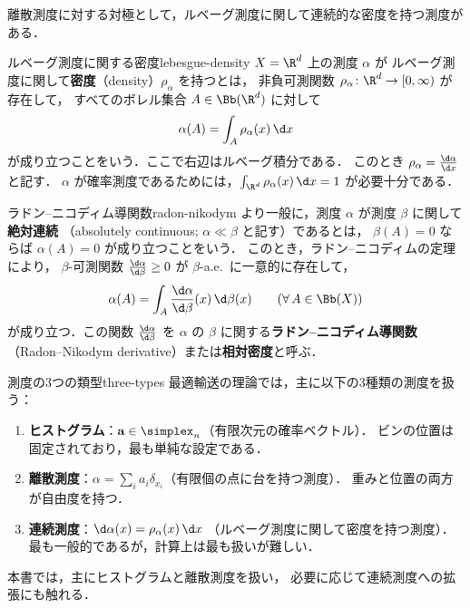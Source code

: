 離散測度に対する対極として，ルベーグ測度に関して連続的な密度を持つ測度がある．

\begin{definition}{ルベーグ測度に関する密度}{lebesgue-density}
  $X = \R^d$ 上の測度 $\alpha$ が
  ルベーグ測度に関して\textbf{密度}（density）$\rho_\alpha$ を持つとは，
  非負可測関数 $\rho_\alpha \colon \R^d \to [0, \infty)$ が存在して，
  すべてのボレル集合 $A \in \Bb(\R^d)$ に対して
  \[
    \alpha(A) = \int_A \rho_\alpha(x) \, \d x
  \]
  が成り立つことをいう．ここで右辺はルベーグ積分である．
  このとき $\rho_\alpha = \frac{\d\alpha}{\d x}$ と記す．
  $\alpha$ が確率測度であるためには，$\int_{\R^d} \rho_\alpha(x) \, \d x = 1$ が必要十分である．
\end{definition}

\begin{definition}{ラドン--ニコディム導関数}{radon-nikodym}
  より一般に，測度 $\alpha$ が測度 $\beta$ に関して\textbf{絶対連続}
  （absolutely continuous; $\alpha \ll \beta$ と記す）であるとは，
  $\beta(A) = 0$ ならば $\alpha(A) = 0$ が成り立つことをいう．
  このとき，ラドン--ニコディムの定理により，
  $\beta$-可測関数 $\frac{\d\alpha}{\d\beta} \geq 0$ が $\beta$-a.e.\ に一意的に存在して，
  \[
    \alpha(A) = \int_A \frac{\d\alpha}{\d\beta}(x) \, \d\beta(x)
    \qquad (\forall\, A \in \Bb(X))
  \]
  が成り立つ．この関数 $\frac{\d\alpha}{\d\beta}$ を
  $\alpha$ の $\beta$ に関する\textbf{ラドン--ニコディム導関数}
  （Radon--Nikodym derivative）または\textbf{相対密度}と呼ぶ．
\end{definition}

\begin{remark}{測度の3つの類型}{three-types}
  最適輸送の理論では，主に以下の3種類の測度を扱う：
  \begin{enumerate}
    \item \textbf{ヒストグラム}：$\mathbf{a} \in \simplex_n$（有限次元の確率ベクトル）．
      ビンの位置は固定されており，最も単純な設定である．
    \item \textbf{離散測度}：$\alpha = \sum_i a_i \delta_{x_i}$（有限個の点に台を持つ測度）．
      重みと位置の両方が自由度を持つ．
    \item \textbf{連続測度}：$\d\alpha(x) = \rho_\alpha(x) \, \d x$
      （ルベーグ測度に関して密度を持つ測度）．
      最も一般的であるが，計算上は最も扱いが難しい．
  \end{enumerate}
  本書では，主にヒストグラムと離散測度を扱い，
  必要に応じて連続測度への拡張にも触れる．
\end{remark}


